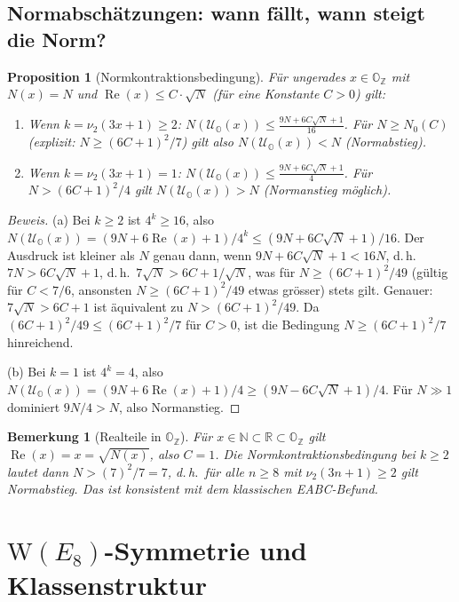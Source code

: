 \documentclass[12pt,a4paper]{article}
\newtheorem{proposition}[definition]{Proposition}
\newtheorem{bemerkung}[definition]{Bemerkung}
\newenvironment{beweis}{\begin{proof}[Beweis]}{\end{proof}}
\newcommand{\vii}{\nu_2}           %
\newcommand{\OZ}{\mathbb{O}_{\mathbb{Z}}}  %
\newcommand{\Norm}[1]{N(#1)}       %
\renewcommand{\Re}{\operatorname{Re}}
\newcommand{\WE}{\mathrm{W}(E_8)}  %
\newcommand{\N}{\mathbb{N}}
\newcommand{\R}{\mathbb{R}}
\newcommand{\Uo}{\mathcal{U}_{\mathbb{O}}} %
\begin{document}
\subsection{Normabschätzungen: wann fällt, wann steigt die Norm?}

\begin{proposition}[Normkontraktionsbedingung]\label{prop:kontraktion}
Für ungerades $x \in \OZ$ mit $\Norm{x} = N$ und $\Re(x) \leq C \cdot \sqrt{N}$
(für eine Konstante $C > 0$) gilt:
\begin{enumerate}[label=(\alph*)]
  \item Wenn $k = \vii(3x+1) \geq 2$: $\Norm{\Uo(x)} \leq \frac{9N + 6C\sqrt{N} + 1}{16}$.
    Für $N \geq N_0(C)$ (explizit: $N \geq (6C+1)^2/7$) gilt also
    $\Norm{\Uo(x)} < N$ (Normabstieg).
  \item Wenn $k = \vii(3x+1) = 1$: $\Norm{\Uo(x)} \leq \frac{9N + 6C\sqrt{N} + 1}{4}$.
    Für $N > (6C+1)^2/4$ gilt $\Norm{\Uo(x)} > N$ (Normanstieg möglich).
\end{enumerate}
\end{proposition}

\begin{beweis}
(a) Bei $k \geq 2$ ist $4^k \geq 16$, also
$\Norm{\Uo(x)} = (9N + 6\Re(x) + 1)/4^k \leq (9N + 6C\sqrt{N} + 1)/16$.
Der Ausdruck ist kleiner als $N$ genau dann, wenn
$9N + 6C\sqrt{N} + 1 < 16N$, d.\,h.\ $7N > 6C\sqrt{N} + 1$,
d.\,h.\ $7\sqrt{N} > 6C + 1/\sqrt{N}$, was für $N \geq (6C+1)^2/49$
(gültig für $C < 7/6$, ansonsten $N \geq (6C+1)^2/49$ etwas grösser)
stets gilt. Genauer: $7\sqrt{N} > 6C+1$ ist äquivalent zu
$N > (6C+1)^2/49$. Da $(6C+1)^2/49 \leq (6C+1)^2/7$ für $C>0$, ist
die Bedingung $N \geq (6C+1)^2/7$ hinreichend.

(b) Bei $k=1$ ist $4^k = 4$, also $\Norm{\Uo(x)} = (9N+6\Re(x)+1)/4 \geq (9N-6C\sqrt{N}+1)/4$.
Für $N \gg 1$ dominiert $9N/4 > N$, also Normanstieg.
\end{beweis}

\begin{bemerkung}[Realteile in $\OZ$]
Für $x \in \N \subset \R \subset \OZ$ gilt $\Re(x) = x = \sqrt{\Norm{x}}$,
also $C=1$. Die Normkontraktionsbedingung bei $k \geq 2$ lautet dann
$N > (7)^2/7 = 7$, d.\,h.\ für alle $n \geq 8$ mit $\vii(3n+1) \geq 2$
gilt Normabstieg. Das ist konsistent mit dem klassischen EABC-Befund.
\end{bemerkung}

\section{\texorpdfstring{$\WE$}{W(E8)}-Symmetrie und Klassenstruktur}
\end{document}
